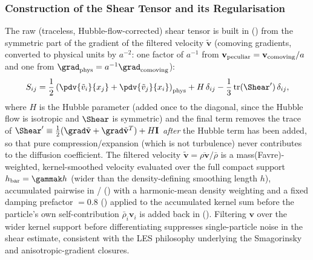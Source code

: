 \subsubsection{Construction of the Shear Tensor and its Regularisation}
\label{sec:shear-def}
The raw (traceless, Hubble-flow-corrected) shear tensor is built in
() from the symmetric part of the
gradient of the filtered velocity $\tilde{\mathbf v}$ (comoving
gradients, converted to physical units by $a^{-2}$: one factor of
$a^{-1}$ from $\mathbf v_{\rm peculiar} = \mathbf v_{\rm comoving}/a$ and
one from $\grad_{\rm phys} = a^{-1}\grad_{\rm comoving}$):
\begin{equation}
  \label{eq:shear_raw}
  S_{ij} = \frac{1}{2}
           \left(\pdv{\tilde v_i}{x_j} + \pdv{\tilde v_j}{x_i}\right)_{\rm phys}
           + H\,\delta_{ij}
           - \frac{1}{3}\,\mathrm{tr}(\Shear')\,\delta_{ij} ,
\end{equation}
where $H$ is the Hubble parameter (added once to the diagonal, since the
Hubble flow is isotropic and $\Shear$ is symmetric) and the final term
removes the trace of $\Shear' \equiv \tfrac12(\grad\tilde{\mathbf v} +
\grad\tilde{\mathbf v}^T) + H\mathbf I$ \emph{after} the Hubble term has
been added, so that pure compression/expansion (which is not turbulence)
never contributes to the diffusion coefficient. The filtered velocity
$\tilde{\mathbf v} = \overline{\rho\mathbf v}/\bar\rho$ is a
mass(Favre)-weighted, kernel-smoothed velocity evaluated over the full
compact support $h_{\rm bar} = \gammak h$ (wider than the density-defining
smoothing length $h$), accumulated pairwise in
/
() with a harmonic-mean density weighting
and a fixed damping prefactor
$= 0.8$
() applied to the accumulated kernel sum before the
particle's own self-contribution $\bar\rho_i \mathbf v_i$ is added back
in  (). Filtering
$\mathbf v$ over the wider kernel support before differentiating
suppresses single-particle noise in the shear estimate, consistent with
the LES philosophy underlying the Smagorinsky and anisotropic-gradient
closures.

